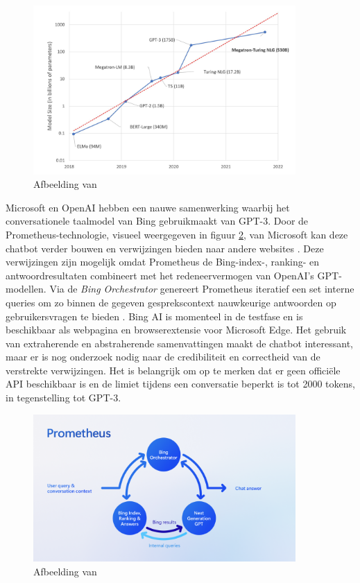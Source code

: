 \begin{figure}[H]
	\begin{center}
		\includegraphics[width=10cm]{img/graph-language-models.png}
		\caption{Afbeelding van \textcite{Simon2021}}
		\label{img:graph-language-models}
	\end{center}
\end{figure}

\medspace

Microsoft en OpenAI hebben een nauwe samenwerking waarbij het conversationele taalmodel van Bing gebruikmaakt van GPT-3. Door de Prometheus-technologie, visueel weergegeven in figuur \ref{img:prometheus-visual}, van Microsoft kan deze chatbot verder bouwen en verwijzingen bieden naar andere websites \autocite{Ribas2023}. Deze verwijzingen zijn mogelijk omdat Prometheus de Bing-index-, ranking- en antwoordresultaten combineert met het redeneervermogen van OpenAI’s GPT-modellen. Via de \textit{Bing Orchestrator} genereert Prometheus iteratief een set interne queries om zo binnen de gegeven gesprekscontext nauwkeurige antwoorden op gebruikersvragen te bieden \autocite{Ribas2023}. Bing AI is momenteel in de testfase en is beschikbaar als webpagina en browserextensie voor Microsoft Edge. Het gebruik van extraherende en abstraherende samenvattingen maakt de chatbot interessant, maar er is nog onderzoek nodig naar de credibiliteit en correctheid van de verstrekte verwijzingen. Het is belangrijk om op te merken dat er geen officiële API beschikbaar is en de limiet tijdens een conversatie beperkt is tot 2000 tokens, in tegenstelling tot GPT-3.

\medspace

\begin{figure}[H]
	\begin{center}
		\includegraphics[width=10cm]{img/bing-ai-prometheus.png}
		\caption{Afbeelding van \textcite{Ribas2023}}
		\label{img:prometheus-visual}
	\end{center}
\end{figure}

